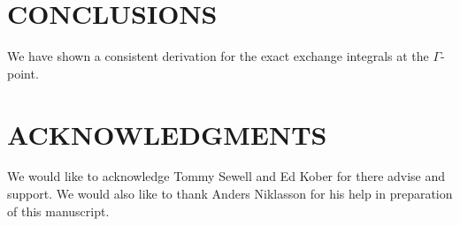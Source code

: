 \documentclass[prb,aps,nobibnotes,twocolumn,doublespace,twocolumngrid,superbib]{revtex4}
\begin{document}
\section{CONCLUSIONS}
We have shown a consistent derivation for the exact exchange integrals at the $\Gamma$-point. 

\section*{ACKNOWLEDGMENTS}

We would like to acknowledge Tommy Sewell and Ed Kober for there advise
and support. We would also like to thank Anders Niklasson for his help
in preparation of this manuscript. 

 
 


\eject

\begin{table}
\caption{Comparison \textbf{MondoSCF} and \textbf{Crystal98} for a 
Magnesium Oxide test system within the Hartree-Fock approxiamtion using
the STO-3G basis set. The \textbf{MondoSCF} calculations where done to
the accuracy of the quoted digits. All calculations where done at the Gamma point
for comparison except the last \textbf{Crystal98} calculation, which was done at 
${\bf k}_{max}=\{6,6,6\}$.}
\label{table:ComToCrystal98}
\end{table}
\end{document}
